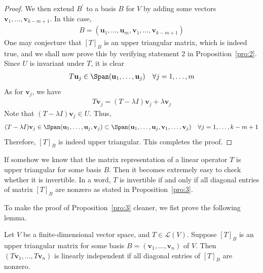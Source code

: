 \documentclass[thmcnt=section, color=blue, 12pt]{my-elegantbook}
\begin{document}
\begin{proof}
    \par We then extend $B^\prime$ to a basis $B$ for $V$ by adding some vectors $\mathbf{v}_1, \ldots, \mathbf{v}_{k-m+1}$. In this case, 
    \begin{align*}
        B = (\mathbf{u}_1, \ldots, \mathbf{u}_m, \mathbf{v}_1, \ldots, \mathbf{v}_{k-m+1})
    \end{align*}
    One may conjecture that $[T]_B$ is an upper triangular matrix, which is indeed true, and we shall now prove this by verifying statement 2 in Proposition~\ref{pro:2}. Since $U$ is invariant under $T$, it is clear 
    \begin{align*}
        T \mathbf{u}_j \in \Span(\mathbf{u}_1, \ldots, \mathbf{u}_j)
        \quad
        \forall j = 1, \ldots, m
    \end{align*}
    As for $\mathbf{v}_j$, we have 
    \begin{align*}
        T \mathbf{v}_j
        = (T - \lambda I) \mathbf{v}_j + \lambda \mathbf{v}_j
    \end{align*}
    Note that $(T - \lambda I) \mathbf{v}_j \in U$. Thus,
    \begin{align*}
        (T - \lambda I) \mathbf{v}_j
        \in \Span(\mathbf{u}_1, \ldots, \mathbf{u}_j, \mathbf{v}_j)
        \subset \Span(\mathbf{u}_1, \ldots, \mathbf{u}_j, \mathbf{v}_1, \ldots, \mathbf{v}_j)
        \quad \forall j = 1, \ldots, k-m+1
    \end{align*}
    Therefore, $[T]_B$ is indeed upper triangular. This completes the proof.
\end{proof}


\par If somehow we know that the matrix representation of a linear operator $T$ is upper triangular for some basis $B$. Then it becomes extremely easy to check whether it is invertible. In a word, $T$ is invertible if and only if all diagonal entries of matrix $[T]_B$ are nonzero as stated in Proposition~\ref{pro:3}.


\par To make the proof of Proposition~\ref{pro:3} cleaner, we fist prove the following lemma.

\begin{lemma} \label{lem:1}
    Let $V$ be a finite-dimensional vector space, and $T \in \mathcal{L}(V)$. Suppose $[T]_B$ is an upper triangular matrix for some basis $B = (\mathbf{v}_1, \ldots, \mathbf{v}_n)$ of $V$. Then $(T \mathbf{v}_1, \ldots, T \mathbf{v}_n)$ is linearly independent if all diagonal entries of $[T]_B$ are nonzero.
\end{lemma}
\end{document}
